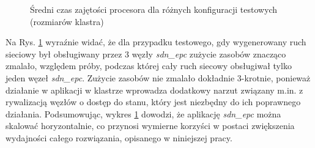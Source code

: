 \begin{figure}[h]
\centering
{}
\caption{Średni czas zajętości procesora dla różnych konfiguracji testowych
  (rozmiarów klastra)}
\label{plot:cpu_usage}
\end{figure}

Na Rys. \ref{plot:cpu_usage} wyraźnie widać, że dla przypadku testowego, gdy
wygenerowany ruch sieciowy był obsługiwany przez 3 węzły \textit{sdn\_epc}
zużycie zasobów znacząco zmalało, względem próby, podczas której cały ruch
siecowy obsługiwał tylko jeden węzeł \textit{sdn\_epc}. Zużycie zasobów nie
zmalało dokładnie 3-krotnie, ponieważ działanie w aplikacji w klastrze wprowadza
dodatkowy narzut związany m.in. z rywalizacją węzłów o dostęp do stanu, który
jest niezbędny do ich poprawnego działania. Podsumowując, wykres
\ref{plot:cpu_usage} dowodzi, że aplikację \textit{sdn\_epc} można skalować
horyzontalnie, co przynosi wymierne korzyści w postaci zwiększenia wydajności
całego rozwiązania, opisanego w niniejszej pracy.